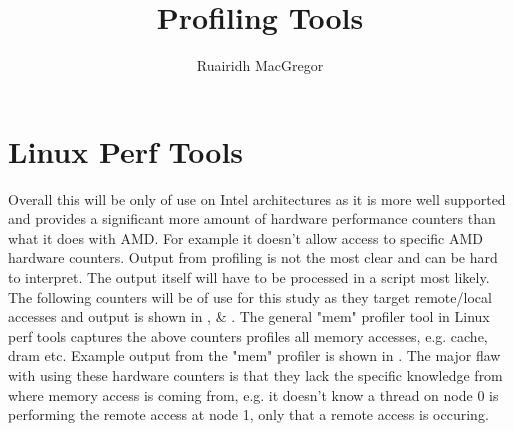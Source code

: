 \documentclass[a4paper,11pt]{article}
\title{Profiling Tools}
\author{Ruairidh MacGregor}
\date{}
\begin{document}
\maketitle

\section{Linux Perf Tools}

Overall this will be only of use on Intel architectures as it is more well supported and provides a significant more amount of hardware performance counters than what it does with AMD. For example it doesn't allow access to specific AMD hardware counters. Output from profiling is not the most clear and can be hard to interpret. The output itself will have to be processed in a script most likely. The following counters will be of use for this study as they target remote/local accesses and output is shown in ,  \& . The general "mem" profiler tool in Linux perf tools captures the above counters profiles all memory accesses, e.g. cache, dram etc. Example output from the "mem" profiler is shown in  . The major flaw with using these hardware counters is that they lack the specific knowledge from where memory access is coming from, e.g. it doesn't know a thread on node 0 is performing the remote access at node 1, only that a remote access is occuring.
\end{document}
